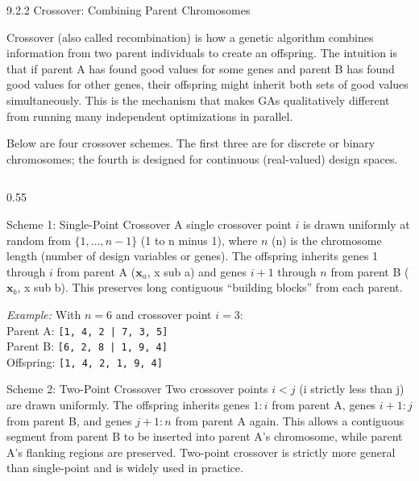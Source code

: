 \documentclass[aspectratio=169,10pt]{beamer}
\newcommand{\bx}{\mathbf{x}}
\begin{document}
\begin{frame}[allowframebreaks]{9.2.2 Crossover: Combining Parent Chromosomes}

  Crossover (also called recombination) is how a genetic algorithm
  combines information from two parent individuals to create an
  offspring.  The intuition is that if parent A has found good values
  for some genes and parent B has found good values for other genes,
  their offspring might inherit both sets of good values simultaneously.
  This is the mechanism that makes GAs qualitatively different from
  running many independent optimizations in parallel.

  Below are four crossover schemes.  The first three are for discrete
  or binary chromosomes; the fourth is designed for continuous
  (real-valued) design spaces.

  \begin{columns}[T]
    \begin{column}{0.55\textwidth}
      \begin{block}{Scheme 1: Single-Point Crossover}
        A single crossover point $i$ is drawn uniformly at random
        from $\{1, \ldots, n{-}1\}$ (1 to n minus 1), where $n$ (n)
        is the chromosome length (number of design variables or genes).
        The offspring inherits genes 1 through $i$ from parent A
        ($\bx_a$, x sub a) and genes $i{+}1$ through $n$ from parent
        B ($\bx_b$, x sub b).  This preserves long contiguous
        ``building blocks'' from each parent.

        \textit{Example:} With $n = 6$ and crossover point $i = 3$:\\
        Parent A: \texttt{[1, 4, 2 | 7, 3, 5]}\\
        Parent B: \texttt{[6, 2, 8 | 1, 9, 4]}\\
        Offspring: \texttt{[1, 4, 2, 1, 9, 4]}
      \end{block}

      \begin{block}{Scheme 2: Two-Point Crossover}
        Two crossover points $i < j$ (i strictly less than j) are
        drawn uniformly.  The offspring inherits genes $1{:}i$ from
        parent A, genes $i{+}1{:}j$ from parent B, and genes
        $j{+}1{:}n$ from parent A again.  This allows a contiguous
        segment from parent B to be inserted into parent A's
        chromosome, while parent A's flanking regions are preserved.
        Two-point crossover is strictly more general than single-point
        and is widely used in practice.
      \end{block}


\end{column}
\end{columns}
\end{frame}
\end{document}
